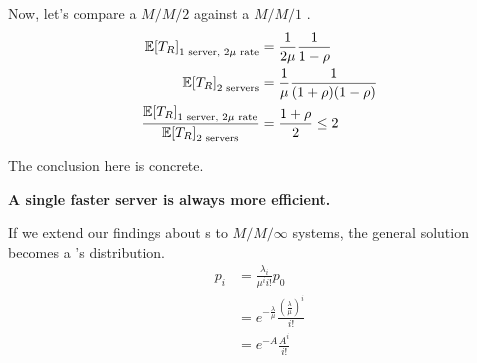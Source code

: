 Now, let's compare a $M/M/2$  against a $M/M/1$ .
\begin{align*}
  {\operatorname{\operatorname{\mathbb{E}}}[T_{R}]}_{\text{1 server, } 2\mu \text{ rate}} &= \frac{1}{2 \mu} \frac{1}{1-\rho} \\
  {\operatorname{\operatorname{\mathbb{E}}}[T_{R}]}_{\text{2 servers}} &= \frac{1}{\mu} \frac{1}{(1+\rho) (1-\rho)} \\
  \frac{{\operatorname{\operatorname{\mathbb{E}}}[T_{R}]}_{\text{1 server, } 2\mu \text{ rate}}}{{\operatorname{\operatorname{\mathbb{E}}}[T_{R}]}_{\text{2 servers}}} &= \frac{1+\rho}{2} \leq 2
\end{align*}

The conclusion here is concrete.
\begin{center}
  \textbf{\Large A single faster server is always more efficient.}
\end{center}

If we extend our findings about s to $M/M/\infty$ systems, the general solution becomes a 's distribution.
\begin{equation}\label{eq:MMinfty_Balance_Equation-Solution}
  \begin{aligned}
    p_{i} &= \frac{\lambda_{i}}{\mu^{i} i!} p_{0} \\
    &= e^{-\frac{\lambda}{\mu}} \frac{{\left( \frac{\lambda}{\mu} \right)}^{i}}{i!} \\
    &= e^{-A} \frac{A^{i}}{i!}
  \end{aligned}
\end{equation}

